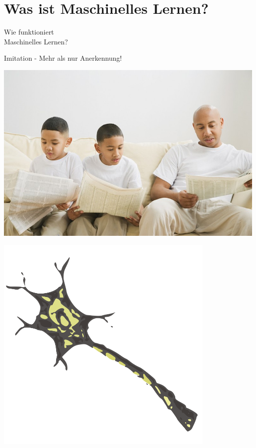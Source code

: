 \documentclass[aspectratio=43,x11names]{beamer}
\begin{document}
\section{Was ist Maschinelles Lernen?}

\begin{frame}
\begin{center}
\huge
Wie funktioniert\\Maschinelles Lernen?
\end{center}
\end{frame}

\begin{frame}
\begin{center}
\Large Imitation - Mehr als nur Anerkennung!
\medskip\medskip

\includegraphics[scale=0.35]{images/imitation}
\end{center}
\end{frame}

\begin{frame}
\begin{center}
\includegraphics[width=0.8\textwidth, height=0.8\textheight]{images/neuron} 
\end{center}
\end{frame}
\end{document}
